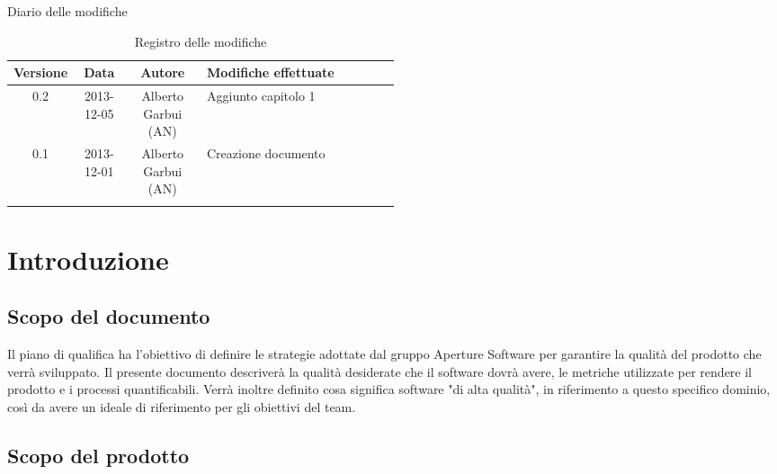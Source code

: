 
\newpage
Diario delle modifiche
\begin{center}
\begin{longtable}{|c|c|c|p{0.5\linewidth}|}
\toprule
\textbf{Versione} & \textbf{Data} & \textbf{Autore} & \textbf{Modifiche effettuate}\\


\midrule
0.2 & 2013-12-05 & Alberto Garbui (AN) & Aggiunto capitolo 1\\
\midrule
0.1 & 2013-12-01 & Alberto Garbui (AN) & Creazione documento\\

\bottomrule
\caption{Registro delle modifiche}
\label{tab:changelog}
\end{longtable}
\end{center}

\newpage
\tableofcontents

\newpage
\listoftables
\listoffigures

\newpage
\section{Introduzione}%
\label{1.0}
\subsection{Scopo del documento}%
\label{1.1}
Il piano di qualifica ha l'obiettivo di definire le strategie adottate dal gruppo Aperture Software per garantire la qualità del prodotto che verrà sviluppato. 
Il presente documento descriverà la qualità desiderate che il software dovrà avere, le metriche utilizzate per rendere il prodotto e i processi quantificabili. Verrà inoltre definito cosa significa software "di alta qualità", in riferimento a questo specifico dominio, così da avere un ideale di riferimento per gli obiettivi del team.

\subsection{Scopo del prodotto}%
\label{1.2}
\Prodotto{}


